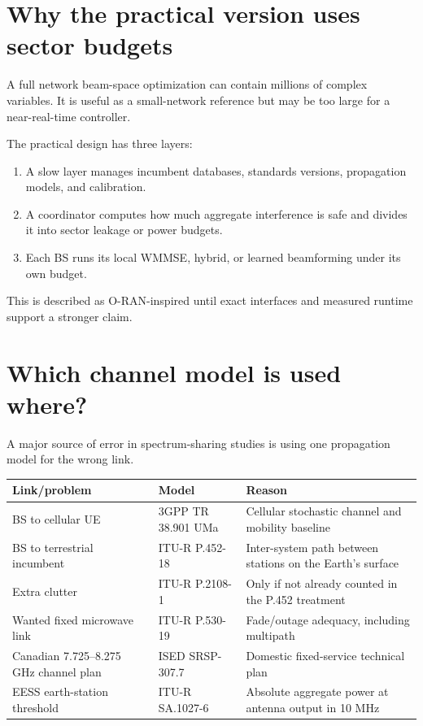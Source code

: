 \documentclass[11pt]{article}
\begin{document}
\section{Why the practical version uses sector budgets}

A full network beam-space optimization can contain millions of complex variables. It is useful as a small-network reference but may be too large for a near-real-time controller.

The practical design has three layers:

\begin{enumerate}
\item A slow layer manages incumbent databases, standards versions, propagation models, and calibration.
\item A coordinator computes how much aggregate interference is safe and divides it into sector leakage or power budgets.
\item Each BS runs its local WMMSE, hybrid, or learned beamforming under its own budget.
\end{enumerate}

This is described as O-RAN-inspired until exact interfaces and measured runtime support a stronger claim.

\section{Which channel model is used where?}

A major source of error in spectrum-sharing studies is using one propagation model for the wrong link.

\begin{longtable}{p{}p{}p{}}
\toprule
Link/problem & Model & Reason\\
\midrule
BS to cellular UE & 3GPP TR 38.901 UMa & Cellular stochastic channel and mobility baseline\\
BS to terrestrial incumbent & ITU-R P.452-18 & Inter-system path between stations on the Earth's surface\\
Extra clutter & ITU-R P.2108-1 & Only if not already counted in the P.452 treatment\\
Wanted fixed microwave link & ITU-R P.530-19 & Fade/outage adequacy, including multipath\\
Canadian 7.725--8.275 GHz channel plan & ISED SRSP-307.7 & Domestic fixed-service technical plan\\
EESS earth-station threshold & ITU-R SA.1027-6 & Absolute aggregate power at antenna output in 10 MHz\\
\bottomrule
\end{longtable}
\end{document}
